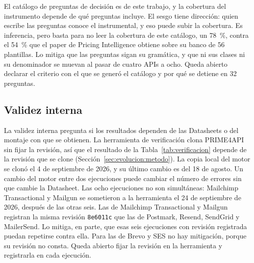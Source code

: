 El catálogo de preguntas de decisión es de este trabajo, y la cobertura del instrumento depende de qué preguntas incluye.
El sesgo tiene dirección: quien escribe las preguntas conoce el instrumental, y eso puede subir la cobertura.
Es inferencia, pero basta para no leer la cobertura de este catálogo, un 78~\%, contra el 54~\% que el paper de Pricing Intelligence \citep{cavero2026pricingintelligence} obtiene sobre su banco de 56 plantillas.
Lo mitiga que las preguntas sigan su gramática, y que ni sus clases ni su denominador se muevan al pasar de cuatro APIs a ocho.
Queda abierto declarar el criterio con el que se generó el catálogo y por qué se detiene en 32 preguntas.

\subsection{Validez interna}\label{sec:conclusiones:interna}

La validez interna pregunta si los resultados dependen de las Datasheets o del montaje con que se obtienen.
La herramienta de verificación clona PRIME4API sin fijar la revisión, así que el resultado de la Tabla~\ref{tab:verificacion} depende de la revisión que se clone (Sección~\ref{sec:evolucion:metodo}).
La copia local del motor se clonó el 4 de septiembre de 2026, y su último cambio es del 18 de agosto.
Un cambio del motor entre dos ejecuciones puede cambiar el número de errores sin que cambie la Datasheet.
Las ocho ejecuciones no son simultáneas: Mailchimp Transactional y Mailgun se sometieron a la herramienta el 24 de septiembre de 2026, después de las otras seis.
Las de Mailchimp Transactional y Mailgun registran la misma revisión \texttt{8e6011c} que las de Postmark, Resend, SendGrid y MailerSend.
Lo mitiga, en parte, que esas seis ejecuciones con revisión registrada puedan repetirse contra ella.
Para las de Brevo y SES no hay mitigación, porque su revisión no consta.
Queda abierto fijar la revisión en la herramienta y registrarla en cada ejecución.


